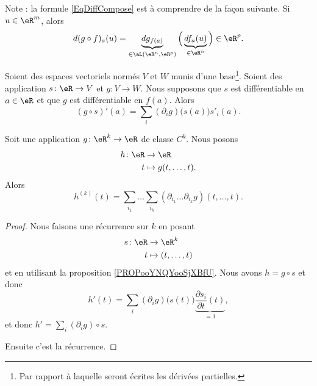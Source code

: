 \begin{remark}
	Note : la formule \eqref{EqDiffCompose} est à comprendre de la façon suivante. Si \( u\in\eR^m\), alors
	\begin{equation}
		d(g\circ f)_a(u)=\underbrace{dg_{f(a)}}_{\in\aL(\eR^n,\eR^p)}\Big( \underbrace{df_a(u)}_{\in\eR^n} \Big)\in\eR^p.
	\end{equation}
\end{remark}

\begin{proposition}	\label{PROPooYNQYooSjXBfU}
	Soient des espaces vectoriels normés \( V\) et \( W\) munis d'une base\footnote{Par rapport à laquelle seront écrites les dérivées partielles.}. Soient des application \(s \colon \eR\to V  \) et \(g \colon V\to W  \). Nous supposons que \( s\) est différentiable en \( a\in \eR\) et que \( g\) est différentiable en \( f(a)\). Alors
	\begin{equation}
		(g\circ s)'(a)=\sum_i(\partial_ig)\big( s(a) \big)s'_i(a).
	\end{equation}
\end{proposition}

\begin{proposition}	\label{PROPooXAGQooRLMshw}
	Soit une application \(g \colon \eR^k\to \eR  \) de classe \( C^k\). Nous posons
	\begin{equation}
		\begin{aligned}
			h\colon \eR & \to \eR                \\
			t           & \mapsto g(t,\ldots,t).
		\end{aligned}
	\end{equation}
	Alors
	\begin{equation}
		h^{(k)}(t)=\sum_{i_1}\ldots \sum_{i_k}(\partial_{i_1}\ldots \partial_{i_k}g)(t,\ldots,t).
	\end{equation}
\end{proposition}

\begin{proof}
	Nous faisons une récurrence sur \( k\) en posant
	\begin{equation}
		\begin{aligned}
			s\colon \eR & \to \eR^k            \\
			t           & \mapsto (t,\ldots,t)
		\end{aligned}
	\end{equation}
	et en utilisant la proposition \ref{PROPooYNQYooSjXBfU}. Nous avons \( h=g\circ s\) et donc
	\begin{equation}
		h'(t)=\sum_i(\partial_ig)\big( s(t) \big)\underbrace{\frac{ \partial s_i }{ \partial t }(t)}_{=1},
	\end{equation}
	et donc \( h'=\sum_i(\partial_ig)\circ s\).

	Ensuite c'est la récurrence.
\end{proof}

